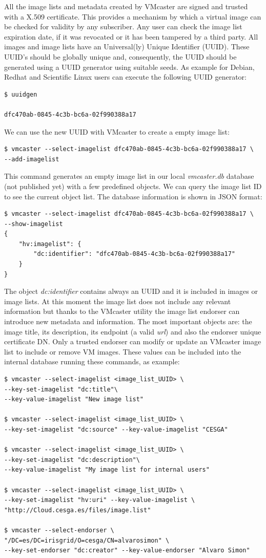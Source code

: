 \documentclass{cai}
\begin{document}
All the image lists and metadata created by VMcaster are signed and trusted with a X.509 certificate.
This provides a mechanism by which a virtual image can be checked for validity by any subscriber. Any user can check the image list expiration date, if it was revocated or it has been tampered by a third party.
All images and image lists have an Universal(ly) Unique Identifier (UUID). These UUID's should be globally unique and, consequently, the UUID should be generated using a UUID generator using suitable seeds. As example for Debian, Redhat and Scientific Linux users can execute the following UUID generator:
\begin{verbatim}
$ uuidgen

dfc470ab-0845-4c3b-bc6a-02f990388a17
\end{verbatim}
We can use the new UUID with VMcaster to create a empty image list:
\begin{verbatim}
$ vmcaster --select-imagelist dfc470ab-0845-4c3b-bc6a-02f990388a17 \
--add-imagelist
\end{verbatim}
This command generates an empty image list in our local \textit{vmcaster.db} database (not published yet) with a few predefined objects. We can query the image list ID to see the current object list.
The database information is shown in JSON format:
\begin{verbatim}
$ vmcaster --select-imagelist dfc470ab-0845-4c3b-bc6a-02f990388a17 \
--show-imagelist
{
    "hv:imagelist": {
        "dc:identifier": "dfc470ab-0845-4c3b-bc6a-02f990388a17"
    }
}
\end{verbatim}
The object \textit{dc:identifier} contains always an UUID and it is included in images or image lists. 
At this moment the image list does not include any relevant information but thanks to the VMcaster utility the image list endorser can introduce new metadata and information.
The most important objects are: the image title, its description, its endpoint (a valid \textit{url}) and also the endorser unique certificate DN. Only a trusted endorser can modify or update an VMcaster image list to include or remove VM images. 
These values can be included into the internal database running these commands, as example:
\begin{verbatim}
$ vmcaster --select-imagelist <image_list_UUID> \
--key-set-imagelist "dc:title"\ 
--key-value-imagelist "New image list"

$ vmcaster --select-imagelist <image_list_UUID> \ 
--key-set-imagelist "dc:source" --key-value-imagelist "CESGA"

$ vmcaster --select-imagelist <image_list_UUID> \ 
--key-set-imagelist "dc:description"\ 
--key-value-imagelist "My image list for internal users"

$ vmcaster --select-imagelist <image_list_UUID> \ 
--key-set-imagelist "hv:uri" --key-value-imagelist \ 
"http://Cloud.cesga.es/files/image.list"

$ vmcaster --select-endorser \ 
"/DC=es/DC=irisgrid/O=cesga/CN=alvarosimon" \
--key-set-endorser "dc:creator" --key-value-endorser "Alvaro Simon"
\end{verbatim}
\end{document}
